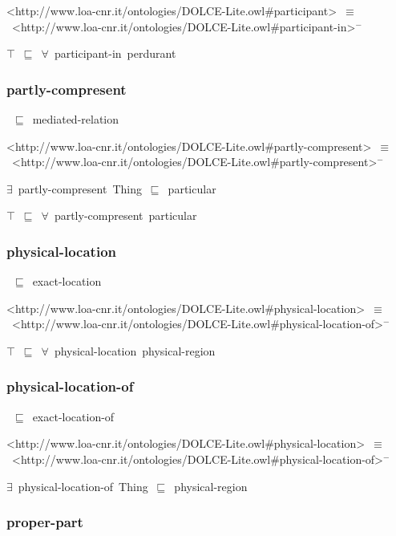 \documentclass{article}
\begin{document}
<http://www.loa-cnr.it/ontologies/DOLCE-Lite.owl#participant>~\ensuremath{\equiv}~<http://www.loa-cnr.it/ontologies/DOLCE-Lite.owl#participant-in>\ensuremath{^-}

\ensuremath{\top}~\ensuremath{\sqsubseteq}~\ensuremath{\forall}~participant-in~perdurant

\subsubsection*{partly-compresent}

~\ensuremath{\sqsubseteq}~mediated-relation

<http://www.loa-cnr.it/ontologies/DOLCE-Lite.owl#partly-compresent>~\ensuremath{\equiv}~<http://www.loa-cnr.it/ontologies/DOLCE-Lite.owl#partly-compresent>\ensuremath{^-}

\ensuremath{\exists}~partly-compresent~Thing~\ensuremath{\sqsubseteq}~particular

\ensuremath{\top}~\ensuremath{\sqsubseteq}~\ensuremath{\forall}~partly-compresent~particular

\subsubsection*{physical-location}

~\ensuremath{\sqsubseteq}~exact-location

<http://www.loa-cnr.it/ontologies/DOLCE-Lite.owl#physical-location>~\ensuremath{\equiv}~<http://www.loa-cnr.it/ontologies/DOLCE-Lite.owl#physical-location-of>\ensuremath{^-}

\ensuremath{\top}~\ensuremath{\sqsubseteq}~\ensuremath{\forall}~physical-location~physical-region

\subsubsection*{physical-location-of}

~\ensuremath{\sqsubseteq}~exact-location-of

<http://www.loa-cnr.it/ontologies/DOLCE-Lite.owl#physical-location>~\ensuremath{\equiv}~<http://www.loa-cnr.it/ontologies/DOLCE-Lite.owl#physical-location-of>\ensuremath{^-}

\ensuremath{\exists}~physical-location-of~Thing~\ensuremath{\sqsubseteq}~physical-region

\subsubsection*{proper-part}
\end{document}
